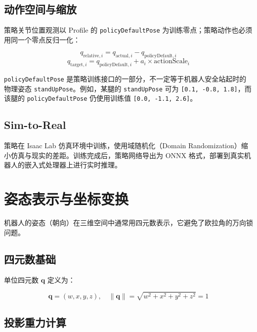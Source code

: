 \documentclass[a4paper,11pt,openany]{book}
\begin{document}
\subsection{动作空间与缩放}

策略关节位置观测以 Profile 的 \texttt{policyDefaultPose} 为训练零点；策略动作也必须用同一个零点反归一化：

\begin{equation}
q_{\mathrm{relative},i}
= q_{\mathrm{actual},i} - q_{\mathrm{policyDefault},i}
\end{equation}
\begin{equation}
q_{\mathrm{target},i}
= q_{\mathrm{policyDefault},i}
+ a_i \times \mathrm{actionScale}_i
\end{equation}

\texttt{policyDefaultPose} 是策略训练接口的一部分，不一定等于机器人安全站起时的物理姿态 \texttt{standUpPose}。例如，某腿的 \texttt{standUpPose} 可为
\texttt{[0.1, -0.8, 1.8]}，而该腿的 \texttt{policyDefaultPose} 仍使用训练值
\texttt{[0.0, -1.1, 2.6]}。

\subsection{Sim-to-Real}

策略在 Isaac Lab 仿真环境中训练，使用域随机化（Domain Randomization）缩小仿真与现实的差距。训练完成后，策略网络导出为 ONNX 格式，部署到真实机器人的嵌入式处理器上进行实时推理。

\section{姿态表示与坐标变换}
\label{sec:attitude}

机器人的姿态（朝向）在三维空间中通常用四元数表示，它避免了欧拉角的万向锁问题。

\subsection{四元数基础}

单位四元数 $\mathbf{q}$ 定义为：

\begin{equation}
\mathbf{q} = (w, x, y, z), \quad \|\mathbf{q}\| = \sqrt{w^2 + x^2 + y^2 + z^2} = 1
\end{equation}

\subsection{投影重力计算}
\end{document}

